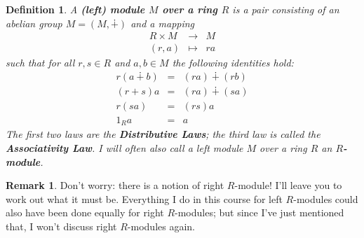 \documentclass[11pt]{amsbook}
\newtheorem{definition}[theorem]{Definition}
\theoremstyle{definition}
\newtheorem{rem}[theorem]{Remark}
\begin{document}
\begin{definition} \label{moduledef} A {\bf (left) module $M$ over a ring $R$} is a pair consisting of an abelian group $M = (M,\dotplus)$ and a mapping
\begin{eqnarray*} R\times M &\to & M  \\ (r , a) &\mapsto& ra
\end{eqnarray*}
such that for all $r, s \in R$ and $a,b \in M$ the following identities hold:
\begin{eqnarray*}
r (a\dotplus b) &=& (ra) \dotplus (rb) \\ (r+s) a &=& (ra) \dotplus (sa) \\ r(s a) &=& (rs)a \\ 1_R a &=& a
\end{eqnarray*}
The first two laws are the {\bf Distributive Laws}; the third law is called the {\bf Associativity Law}. I will often also call a left module $M$ over a ring $R$ an {\bf $R$-module}.
\end{definition}

\begin{rem} Don't worry: there is a notion of right $R$-module! I'll leave you to work out what it must be. Everything I do in this course for left $R$-modules could also have been done equally for right $R$-modules; but since I've just mentioned that, I won't discuss right $R$-modules again.  \end{rem}
\end{document}
